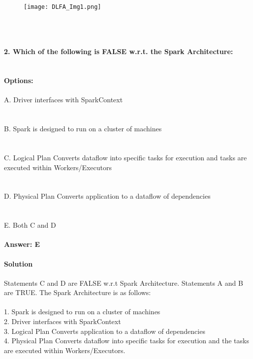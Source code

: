 \documentclass[prl,twocolumn,showpacs,preprintnumbers,superscriptaddress]{revtex4}
\theoremstyle{plain}
\theoremstyle{definition}
\begin{document}
\begin{widetext}
\begin{figure}[H]
\begin{center}
    \texttt{[image: DLFA\_Img1.png]}
\end{center}
\end{figure}
\\
\\
\\
\newpage
\noindent\textbf{2. Which of the following is FALSE w.r.t. the Spark Architecture:}
\\
\\
\\
\textbf{Options:}
\\
\\
\noindent A. Driver interfaces with SparkContext
\\
\\
\\
B. Spark is designed to run on a cluster of machines
\\
\\
\\
C. Logical Plan Converts dataflow into specific tasks for execution and tasks are executed within Workers/Executors
\\
\\
\\
D. Physical Plan Converts application to a dataflow of dependencies
\\
\\
\\
E. Both C and D
\\
\\
\textbf{Answer: E}
\\
\\
\textbf{Solution}
\\
\\
Statements C and D are FALSE w.r.t Spark Architecture. Statements A and B are TRUE. The Spark Architecture is as follows:
\\
\\
1. Spark is designed to run on a cluster of machines
\\
2. Driver interfaces with SparkContext
\\
3. Logical Plan Converts application to a dataflow of dependencies
\\
4. Physical Plan Converts dataflow into specific tasks for execution and the tasks are executed within Workers/Executors.
\\
\\
\\

\end{widetext}
\end{document}
